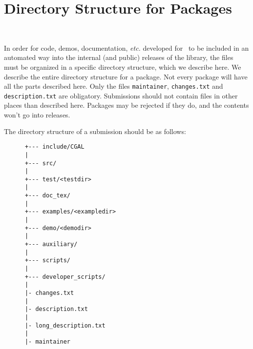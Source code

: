 
\chapter{Directory Structure for Packages}
\label{chap:directory_structure}
 \\

In order for code, demos, documentation, {\em etc.} developed for \cgal\ to 
be included in an automated way into the internal (and public) releases of the 
library, the files must be organized in a specific directory structure, which 
we describe here.  We describe the entire directory structure for a package. 
Not every package will have all the parts described here. Only the files
{\tt maintainer}, {\tt changes.txt} and {\tt description.txt} 
are obligatory.
Submissions should not contain files in other places than described here.
Packages may be rejected if they do, and the contents won't go into releases.

The directory structure of a submission should be as follows: 

\begin{verbatim}
      +--- include/CGAL
      |
      +--- src/
      |
      +--- test/<testdir>
      |
      +--- doc_tex/
      |
      +--- examples/<exampledir>
      |
      +--- demo/<demodir>
      |
      +--- auxiliary/
      |
      +--- scripts/
      |
      +--- developer_scripts/
      |
      |- changes.txt
      |
      |- description.txt
      |
      |- long_description.txt
      |
      |- maintainer
\end{verbatim}


